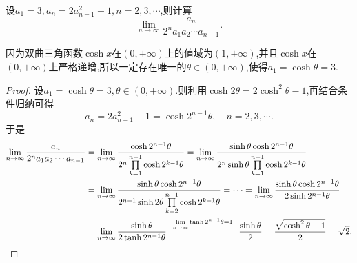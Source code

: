 \documentclass[../../main.tex]{subfiles}%
\begin{document}
\begin{example}\label{example:例3.82-利用双曲三角函数求递推数列}
设\(a_1 = 3,a_n=2a_{n - 1}^{2}-1,n = 2,3,\cdots\),则计算
\[
\lim_{n\rightarrow\infty}\frac{a_n}{2^n a_1a_2\cdots a_{n - 1}}.
\]
\end{example}
\begin{remark}
因为双曲三角函数\(\cosh x\)在\((0, +\infty)\)上的值域为\((1, +\infty)\),并且\(\cosh x\)在\((0, +\infty)\)上严格递增,所以一定存在唯一的\(\theta \in (0, +\infty)\),使得\(a_1 = \cosh\theta = 3\).
\end{remark}
\begin{proof}
设\(a_1 = \cosh\theta=3, \theta \in (0, +\infty)\).则利用\(\cosh 2\theta = 2\cosh^2\theta - 1\),再结合条件归纳可得
\[
a_n = 2a_{n - 1}^{2} - 1 = \cosh 2^{n - 1}\theta, \quad n = 2, 3, \cdots.
\]
于是
\begin{align*}
\lim_{n\rightarrow \infty} \frac{a_n}{2^na_1a_2\cdots a_{n - 1}}
&=\lim_{n\rightarrow \infty} \frac{\cosh 2^{n - 1}\theta}{2^n\prod\limits_{k = 1}^{n - 1}{\cosh 2^{k - 1}\theta}}
=\lim_{n\rightarrow \infty} \frac{\sinh\theta\cosh 2^{n - 1}\theta}{2^n\sinh\theta\prod\limits_{k = 1}^{n - 1}{\cosh 2^{k - 1}\theta}}\\
&=\lim_{n\rightarrow \infty} \frac{\sinh\theta\cosh 2^{n - 1}\theta}{2^{n - 1}\sinh 2\theta\prod\limits_{k = 2}^{n - 1}{\cosh 2^{k - 1}\theta}}
=\cdots
=\lim_{n\rightarrow \infty} \frac{\sinh\theta\cosh 2^{n - 1}\theta}{2\sinh 2^{n - 1}\theta}\\
&=\lim_{n\rightarrow \infty} \frac{\sinh\theta}{2\tanh 2^{n - 1}\theta}
\xlongequal{\lim\limits_{n\rightarrow \infty} \tanh 2^{n - 1}\theta = 1}\frac{\sinh\theta}{2}=\frac{\sqrt{\cosh ^2\theta -1}}{2}=\sqrt{2}.
\end{align*}
\end{proof}
\end{document}
